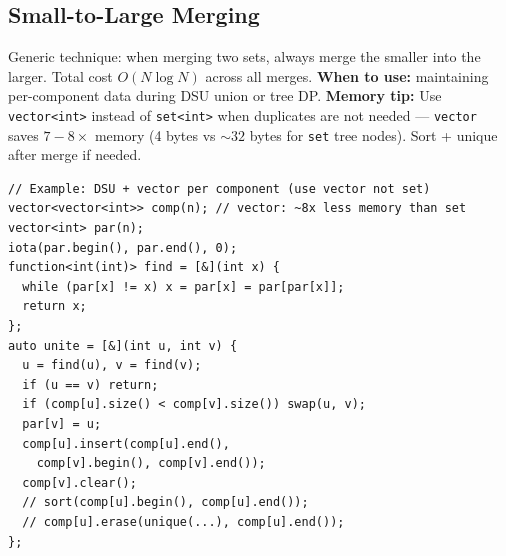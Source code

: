 \subsection{Small-to-Large Merging}
Generic technique: when merging two sets, always merge the smaller into the larger.
Total cost $O(N \log N)$ across all merges.
\textbf{When to use:} maintaining per-component data during DSU union or tree DP.
\textbf{Memory tip:} Use \texttt{vector<int>} instead of \texttt{set<int>} when duplicates are not needed --- \texttt{vector} saves $7-8\times$ memory (4 bytes vs $\sim 32$ bytes for \texttt{set} tree nodes). Sort + unique after merge if needed.
\begin{verbatim}
// Example: DSU + vector per component (use vector not set)
vector<vector<int>> comp(n); // vector: ~8x less memory than set
vector<int> par(n);
iota(par.begin(), par.end(), 0);
function<int(int)> find = [&](int x) {
  while (par[x] != x) x = par[x] = par[par[x]];
  return x;
};
auto unite = [&](int u, int v) {
  u = find(u), v = find(v);
  if (u == v) return;
  if (comp[u].size() < comp[v].size()) swap(u, v);
  par[v] = u;
  comp[u].insert(comp[u].end(),
    comp[v].begin(), comp[v].end());
  comp[v].clear();
  // sort(comp[u].begin(), comp[u].end());
  // comp[u].erase(unique(...), comp[u].end());
};
\end{verbatim}
